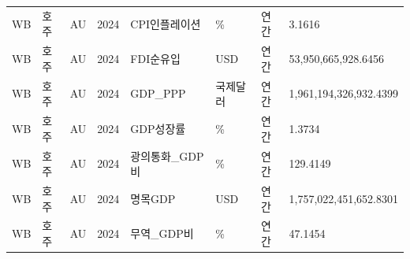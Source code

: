 \documentclass[11pt,a4paper]{article}
\begin{document}
\begin{longtable}{llllllll}
WB & 호주 & AU & 2024 & CPI인플레이션 & \% & 연간 & 3.1616 \\
WB & 호주 & AU & 2024 & FDI순유입 & USD & 연간 & 53,950,665,928.6456 \\
WB & 호주 & AU & 2024 & GDP\_PPP & 국제달러 & 연간 & 1,961,194,326,932.4399 \\
WB & 호주 & AU & 2024 & GDP성장률 & \% & 연간 & 1.3734 \\
WB & 호주 & AU & 2024 & 광의통화\_GDP비 & \% & 연간 & 129.4149 \\
WB & 호주 & AU & 2024 & 명목GDP & USD & 연간 & 1,757,022,451,652.8301 \\
WB & 호주 & AU & 2024 & 무역\_GDP비 & \% & 연간 & 47.1454 \\
\end{longtable}
\end{document}
